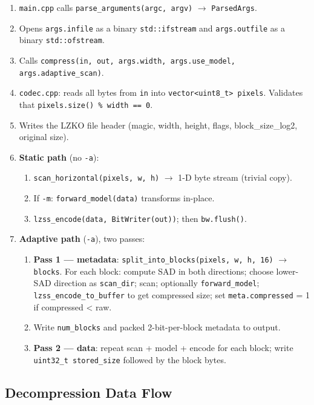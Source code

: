 \begin{enumerate}
  \item \texttt{main.cpp} calls \texttt{parse\_arguments(argc, argv)} $\to$ \texttt{ParsedArgs}.
  \item Opens \texttt{args.infile} as a binary \texttt{std::ifstream} and \texttt{args.outfile}
        as a binary \texttt{std::ofstream}.
  \item Calls \texttt{compress(in, out, args.width, args.use\_model, args.adaptive\_scan)}.
  \item \texttt{codec.cpp}: reads all bytes from \texttt{in} into \texttt{vector\textless uint8\_t\textgreater{} pixels}.
        Validates that \texttt{pixels.size() \% width == 0}.
  \item Writes the LZKO file header (magic, width, height, flags, block\_size\_log2, original size).
  \item \textbf{Static path} (no \texttt{-a}):
    \begin{enumerate}
      \item \texttt{scan\_horizontal(pixels, w, h)} $\to$ 1-D byte stream (trivial copy).
      \item If \texttt{-m}: \texttt{forward\_model(data)} transforms in-place.
      \item \texttt{lzss\_encode(data, BitWriter(out))}; then \texttt{bw.flush()}.
    \end{enumerate}
  \item \textbf{Adaptive path} (\texttt{-a}), two passes:
    \begin{enumerate}
      \item \textbf{Pass 1 --- metadata}: \texttt{split\_into\_blocks(pixels, w, h, 16)} $\to$ \texttt{blocks}.
            For each block: compute SAD in both directions; choose lower-SAD direction as
            \texttt{scan\_dir}; scan; optionally \texttt{forward\_model}; \texttt{lzss\_encode\_to\_buffer}
            to get compressed size; set \texttt{meta.compressed} = 1 if compressed \textless{} raw.
      \item Write \texttt{num\_blocks} and packed 2-bit-per-block metadata to output.
      \item \textbf{Pass 2 --- data}: repeat scan + model + encode for each block;
            write \texttt{uint32\_t stored\_size} followed by the block bytes.
    \end{enumerate}
\end{enumerate}

\subsection{Decompression Data Flow}

